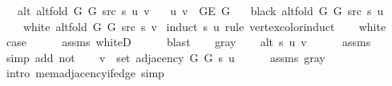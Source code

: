 \begin{isabellebody}
\ \ \ {\isachardoublequoteopen}alt\ {\isacharparenleft}{\kern0pt}alt{\isacharunderscore}{\kern0pt}fold\ G{}\ G{}\ src\ s{\isacharparenright}{\kern0pt}\ u\ v{\isachardoublequoteclose}\isanewline
\ \ \ {\isachardoublequoteopen}{\isacharbraceleft}{\kern0pt}u{\isacharcomma}{\kern0pt}\ v{\isacharbraceright}{\kern0pt}\ {\isasymin}\ G{\isachardot}{\kern0pt}E\ G{\isachardoublequoteclose}\isanewline
\ \ \ {\isachardoublequoteopen}black\ {\isacharparenleft}{\kern0pt}alt{\isacharunderscore}{\kern0pt}fold\ G{}\ G{}\ src\ s{\isacharparenright}{\kern0pt}\ u{\isachardoublequoteclose}\isanewline
\ \ \ {\isachardoublequoteopen}{\isasymnot}\ white\ {\isacharparenleft}{\kern0pt}alt{\isacharunderscore}{\kern0pt}fold\ G{}\ G{}\ src\ s{\isacharparenright}{\kern0pt}\ v{\isachardoublequoteclose}\isanewline
%
\isadelimproof
%
\endisadelimproof
%
\isatagproof
{}\isamarkupfalse%
\ {\isacharparenleft}{\kern0pt}induct\ s\ u\ rule{\isacharcolon}{\kern0pt}\ vertex{\isacharunderscore}{\kern0pt}color{\isacharunderscore}{\kern0pt}induct{\isacharparenright}{\kern0pt}\isanewline
\ \ \isamarkupfalse%
\ white\isanewline
\ \ \isamarkupfalse%
\ {\isacharquery}{\kern0pt}case\isanewline
\ \ \ \ \isamarkupfalse%
\ assms{\isacharparenleft}{\kern0pt}{}{\isacharparenright}{\kern0pt}\ whiteD\isanewline
\ \ \ \ \isamarkupfalse%
\ blast\isanewline
{}\isamarkupfalse%
\isanewline
\ \ \isamarkupfalse%
\ gray\isanewline
\ \ \isamarkupfalse%
\ {\isachardoublequoteopen}alt\ s\ u\ v{\isachardoublequoteclose}\isanewline
\ \ \ \ \isamarkupfalse%
\ assms{\isacharparenleft}{\kern0pt}{}{\isacharparenright}{\kern0pt}\isanewline
\ \ \ \ \isamarkupfalse%
\ {\isacharparenleft}{\kern0pt}simp\ add{\isacharcolon}{\kern0pt}\ not{\isacharunderscore}{\kern0pt}{\isacharparenleft}{\kern0pt}{}{\isacharparenright}{\kern0pt}{\isacharparenright}{\kern0pt}\isanewline
\ \ \isamarkupfalse%
\ {\isachardoublequoteopen}v\ {\isasymin}\ set\ {\isacharparenleft}{\kern0pt}adjacency\ G{}\ G{}\ s\ u{\isacharparenright}{\kern0pt}{\isachardoublequoteclose}\isanewline
\ \ \ \ \isamarkupfalse%
\ assms{\isacharparenleft}{\kern0pt}{}{\isacharparenright}{\kern0pt}\ gray\isanewline
\ \ \ \ \isamarkupfalse%
\ {\isacharparenleft}{\kern0pt}intro\ mem{\isacharunderscore}{\kern0pt}adjacency{\isacharunderscore}{\kern0pt}if{\isacharunderscore}{\kern0pt}edge{\isacharparenright}{\kern0pt}\ simp{\isacharplus}{\kern0pt}\isanewline

\end{isabellebody}
